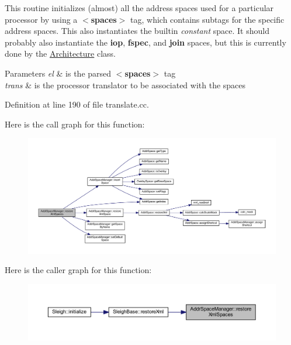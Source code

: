 This routine initializes (almost) all the address spaces used for a particular processor by using a {\bfseries{$<$spaces$>$}} tag, which contains subtags for the specific address spaces. This also instantiates the builtin {\itshape constant} space. It should probably also instantiate the {\bfseries{iop}}, {\bfseries{fspec}}, and {\bfseries{join}} spaces, but this is currently done by the \mbox{\hyperlink{class_architecture}{Architecture}} class. 
\begin{DoxyParams}{Parameters}
{\em el} & is the parsed {\bfseries{$<$spaces$>$}} tag \\
\hline
{\em trans} & is the processor translator to be associated with the spaces \\
\hline
\end{DoxyParams}


Definition at line 190 of file translate.\+cc.

Here is the call graph for this function\+:
\nopagebreak
\begin{figure}[H]
\begin{center}
\leavevmode
\includegraphics[width=350pt]{class_addr_space_manager_a196d3c70790942337861ae7d571c5e31_cgraph}
\end{center}
\end{figure}
Here is the caller graph for this function\+:
\nopagebreak
\begin{figure}[H]
\begin{center}
\leavevmode
\includegraphics[width=350pt]{class_addr_space_manager_a196d3c70790942337861ae7d571c5e31_icgraph}
\end{center}
\end{figure}
\mbox{\label{class_addr_space_manager_a309aefdf92c8a631096916128772a116}} 
